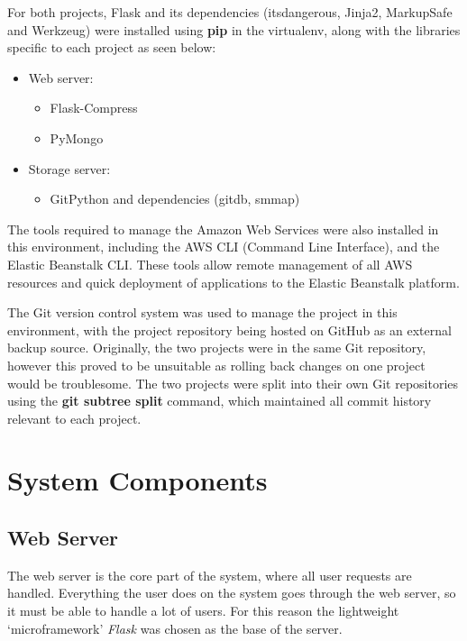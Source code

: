 For both projects, Flask and its dependencies (itsdangerous, Jinja2, MarkupSafe and Werkzeug) were installed using \textbf{pip} in the virtualenv, along with the libraries specific to each project as seen below:

\begin{itemize}
	\item Web server:
	\begin{itemize}
		\item Flask-Compress
		\item PyMongo
	\end{itemize}
	\item Storage server:
	\begin{itemize}
		\item GitPython and dependencies (gitdb, smmap)
	\end{itemize}
\end{itemize}

The tools required to manage the Amazon Web Services were also installed in this environment, including the AWS CLI (Command Line Interface), and the Elastic Beanstalk CLI. These tools allow remote management of all AWS resources and quick deployment of applications to the Elastic Beanstalk platform.

The Git version control system was used to manage the project in this environment, with the project repository being hosted on GitHub as an external backup source. Originally, the two projects were in the same Git repository, however this proved to be unsuitable as rolling back changes on one project would be troublesome. The two projects were split into their own Git repositories using the \textbf{git subtree split} command, which maintained all commit history relevant to each project.

\section{System Components}
\label{section:systemcomponents}
	\subsection{Web Server}
	\label{subsection:webserverdev}
	The web server is the core part of the system, where all user requests are handled. Everything the user does on the system goes through the web server, so it must be able to handle a lot of users. For this reason the lightweight `microframework' \emph{Flask} was chosen as the base of the server.

